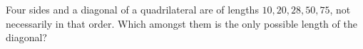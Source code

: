 Four sides and a diagonal of a quadrilateral are of lengths $10,20,28,50,75$, not necessarily in that order. Which amongst them is the only possible length of the diagonal?
